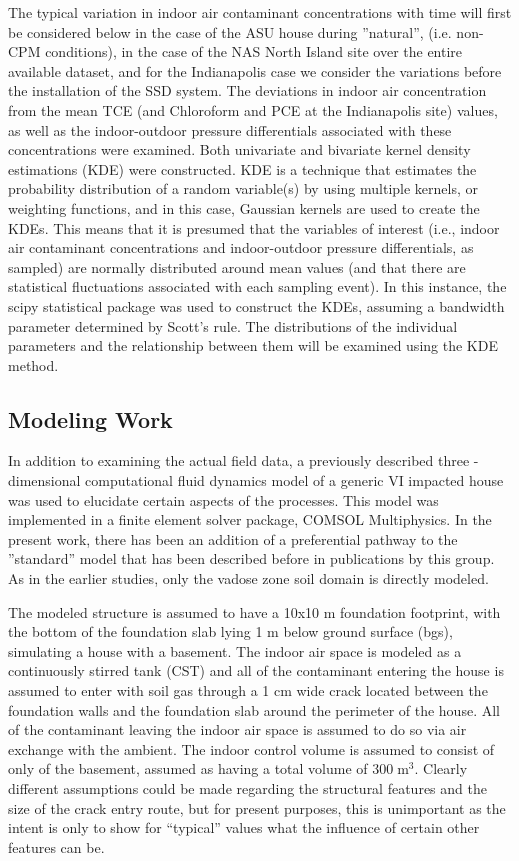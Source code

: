 \documentclass[journal=esthag,manuscript=article]{achemso}
\begin{document}
The typical variation in indoor air contaminant concentrations with time will first be considered below in the case of the ASU house during ”natural”, (i.e. non-CPM conditions), in the case of the NAS North Island site over the entire available dataset, and for the Indianapolis case we consider the variations before the installation of the SSD system.
The deviations in indoor air concentration from the mean TCE (and Chloroform and PCE at the Indianapolis site) values, as well as the indoor-outdoor pressure differentials associated with these concentrations were examined.
Both univariate and bivariate kernel density estimations (KDE) were constructed.
KDE is a technique that estimates the probability distribution of a random variable(s) by using multiple kernels, or weighting functions, and in this case, Gaussian kernels are used to create the KDEs.
This means that it is presumed that the variables of interest (i.e., indoor air contaminant concentrations and indoor-outdoor pressure differentials, as sampled) are normally distributed around mean values (and that there are statistical fluctuations associated with each sampling event).
In this instance, the scipy statistical package was used to construct the KDEs, assuming a bandwidth parameter determined by Scott's rule.
The distributions of the individual parameters and the relationship between them will be examined using the KDE method.

\subsection{Modeling Work}
In addition to examining the actual field data, a previously described three -dimensional computational fluid dynamics model of a generic VI impacted house was used to elucidate certain aspects of  the processes.
This model was implemented in a finite element solver package, COMSOL Multiphysics.
In the present work, there has been an addition of a preferential pathway to the ”standard” model that has been described before in publications by this group\cite{shen_influence_2013,yao_investigating_2017,yao_three-dimensional_2017}.
As in the earlier studies, only the vadose zone soil domain is directly modeled.

The modeled structure is assumed to have a 10x10 m foundation footprint, with the bottom of the foundation slab lying 1 m below ground surface (bgs), simulating a house with a basement.
The indoor air space is modeled as a continuously stirred tank (CST)\cite{u.s._environmental_protection_agency_oswer_2015} and all of the contaminant entering the house is assumed to enter with soil gas through a 1 cm wide crack located between the foundation walls and the foundation slab around the perimeter of the house.
All of the contaminant leaving the indoor air space is assumed to do so via air exchange with the ambient.
The indoor control volume is assumed to consist of only of the basement, assumed as having a total volume of $300 \; \mathrm{m^3}$.
Clearly different assumptions could be made regarding the structural features and the size of the crack entry route, but for present purposes, this is unimportant as the intent is only to show for “typical” values what the influence of certain other features can be. \par
\end{document}
